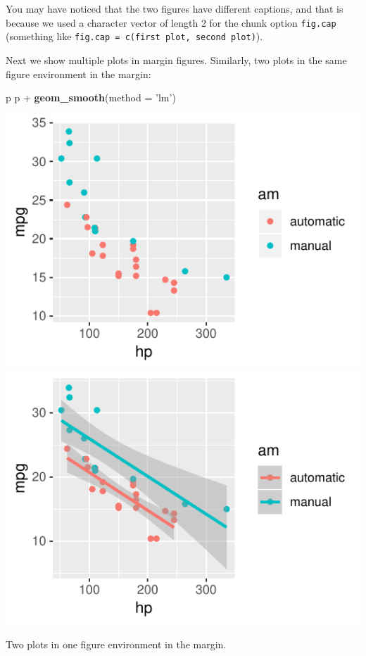 \documentclass[]{tufte-handout}
\newenvironment{Shaded}{}{}
\newcommand{\DataTypeTok}[1]{\textcolor[rgb]{0.56,0.13,0.00}{#1}}
\newcommand{\KeywordTok}[1]{\textcolor[rgb]{0.00,0.44,0.13}{\textbf{#1}}}
\newcommand{\NormalTok}[1]{#1}
\newcommand{\OperatorTok}[1]{\textcolor[rgb]{0.40,0.40,0.40}{#1}}
\newcommand{\StringTok}[1]{\textcolor[rgb]{0.25,0.44,0.63}{#1}}
\begin{document}
You may have noticed that the two figures have different captions, and
that is because we used a character vector of length 2 for the chunk
option \texttt{fig.cap} (something like
\texttt{fig.cap\ =\ c(\textquotesingle{}first\ plot\textquotesingle{},\ \textquotesingle{}second\ plot\textquotesingle{})}).

Next we show multiple plots in margin figures. Similarly, two plots in
the same figure environment in the margin:

\begin{Shaded}
\begin{Highlighting}[]
\NormalTok{p}
\NormalTok{p }\OperatorTok{+}\StringTok{ }\KeywordTok{geom_smooth}\NormalTok{(}\DataTypeTok{method =} \StringTok{'lm'}\NormalTok{)}
\end{Highlighting}
\end{Shaded}

\begin{marginfigure}
\includegraphics{Epi_Notes_files/figure-latex/fig-margin-together-1} \includegraphics{Epi_Notes_files/figure-latex/fig-margin-together-2} \caption[Two plots in one figure environment in the margin]{Two plots in one figure environment in the margin.}\label{fig:fig-margin-together}
\end{marginfigure}
\end{document}
